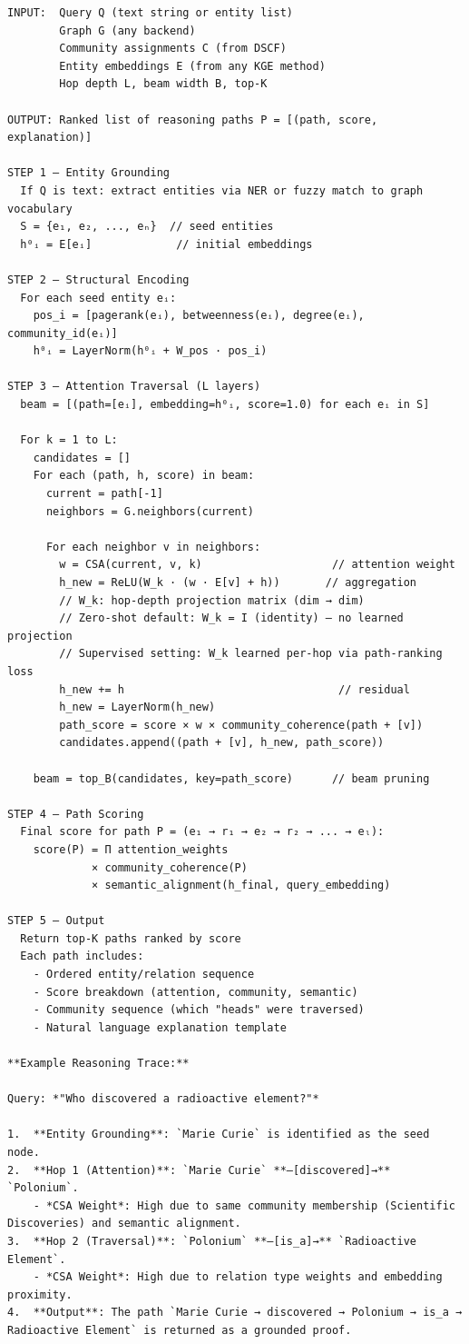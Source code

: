 \documentclass[10pt,journal,compsoc]{IEEEtran}
\begin{document}
\begin{lstlisting}
INPUT:  Query Q (text string or entity list)
        Graph G (any backend)
        Community assignments C (from DSCF)
        Entity embeddings E (from any KGE method)
        Hop depth L, beam width B, top-K

OUTPUT: Ranked list of reasoning paths P = [(path, score, explanation)]

STEP 1 — Entity Grounding
  If Q is text: extract entities via NER or fuzzy match to graph vocabulary
  S = {e₁, e₂, ..., eₙ}  // seed entities
  h⁰ᵢ = E[eᵢ]             // initial embeddings

STEP 2 — Structural Encoding
  For each seed entity eᵢ:
    pos_i = [pagerank(eᵢ), betweenness(eᵢ), degree(eᵢ), community_id(eᵢ)]
    h⁰ᵢ = LayerNorm(h⁰ᵢ + W_pos · pos_i)

STEP 3 — Attention Traversal (L layers)
  beam = [(path=[eᵢ], embedding=h⁰ᵢ, score=1.0) for each eᵢ in S]

  For k = 1 to L:
    candidates = []
    For each (path, h, score) in beam:
      current = path[-1]
      neighbors = G.neighbors(current)

      For each neighbor v in neighbors:
        w = CSA(current, v, k)                    // attention weight
        h_new = ReLU(W_k · (w · E[v] + h))       // aggregation
        // W_k: hop-depth projection matrix (dim → dim)
        // Zero-shot default: W_k = I (identity) — no learned projection
        // Supervised setting: W_k learned per-hop via path-ranking loss
        h_new += h                                 // residual
        h_new = LayerNorm(h_new)
        path_score = score × w × community_coherence(path + [v])
        candidates.append((path + [v], h_new, path_score))

    beam = top_B(candidates, key=path_score)      // beam pruning

STEP 4 — Path Scoring
  Final score for path P = (e₁ → r₁ → e₂ → r₂ → ... → eₗ):
    score(P) = Π attention_weights
             × community_coherence(P)
             × semantic_alignment(h_final, query_embedding)

STEP 5 — Output
  Return top-K paths ranked by score
  Each path includes:
    - Ordered entity/relation sequence
    - Score breakdown (attention, community, semantic)
    - Community sequence (which "heads" were traversed)
    - Natural language explanation template

**Example Reasoning Trace:**

Query: *"Who discovered a radioactive element?"*

1.  **Entity Grounding**: `Marie Curie` is identified as the seed node.
2.  **Hop 1 (Attention)**: `Marie Curie` **—[discovered]→** `Polonium`.
    - *CSA Weight*: High due to same community membership (Scientific Discoveries) and semantic alignment.
3.  **Hop 2 (Traversal)**: `Polonium` **—[is_a]→** `Radioactive Element`.
    - *CSA Weight*: High due to relation type weights and embedding proximity.
4.  **Output**: The path `Marie Curie → discovered → Polonium → is_a → Radioactive Element` is returned as a grounded proof.
\end{lstlisting}
\end{document}
